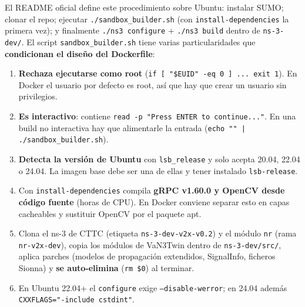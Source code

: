 \documentclass[11pt,a4paper]{article}
\begin{document}
El README oficial define este procedimiento sobre Ubuntu:
instalar SUMO; clonar el repo; ejecutar \texttt{./sandbox\_builder.sh}
(con \texttt{install-dependencies} la primera vez); y finalmente
\texttt{./ns3 configure} + \texttt{./ns3 build} dentro de
\texttt{ns-3-dev/}. El script \texttt{sandbox\_builder.sh} tiene varias
particularidades que \textbf{condicionan el dise\~no del Dockerfile}:

\begin{enumerate}
  \item \textbf{Rechaza ejecutarse como root} (\texttt{if [ "\$EUID" -eq 0 ]
  ... exit 1}). En Docker el usuario por defecto es root, as\'i que hay que
  crear un usuario sin privilegios.
  \item \textbf{Es interactivo}: contiene \texttt{read -p "Press ENTER to
  continue..."}. En una build no interactiva hay que alimentarle la entrada
  (\texttt{echo "" | ./sandbox\_builder.sh}).
  \item \textbf{Detecta la versi\'on de Ubuntu} con \texttt{lsb\_release} y
  solo acepta 20.04, 22.04 o 24.04. La imagen base debe ser una de ellas y
  tener instalado \texttt{lsb-release}.
  \item Con \texttt{install-dependencies} compila \textbf{gRPC v1.60.0 y
  OpenCV desde c\'odigo fuente} (horas de CPU). En Docker conviene separar
  esto en capas cacheables y sustituir OpenCV por el paquete apt.
  \item Clona el ns-3 de CTTC (etiqueta \texttt{ns-3-dev-v2x-v0.2}) y el
  m\'odulo \texttt{nr} (rama \texttt{nr-v2x-dev}), copia los m\'odulos de
  VaN3Twin dentro de \texttt{ns-3-dev/src/}, aplica parches (modelos de
  propagaci\'on extendidos, SignalInfo, ficheros Sionna) y
  \textbf{se auto-elimina} (\texttt{rm \$0}) al terminar.
  \item En Ubuntu 22.04+ el \texttt{configure} exige
  \texttt{--disable-werror}; en 24.04 adem\'as
  \texttt{CXXFLAGS="-include cstdint"}.
\end{enumerate}
\end{document}
